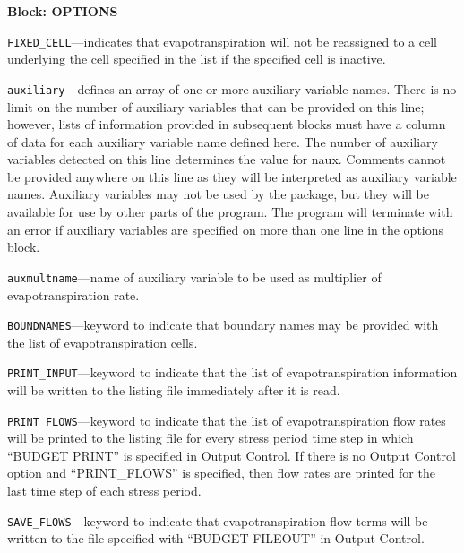 
\item \textbf{Block: OPTIONS}

\begin{description}
\item \texttt{FIXED\_CELL}---indicates that evapotranspiration will not be reassigned to a cell underlying the cell specified in the list if the specified cell is inactive.

\item \texttt{auxiliary}---defines an array of one or more auxiliary variable names.  There is no limit on the number of auxiliary variables that can be provided on this line; however, lists of information provided in subsequent blocks must have a column of data for each auxiliary variable name defined here.   The number of auxiliary variables detected on this line determines the value for naux.  Comments cannot be provided anywhere on this line as they will be interpreted as auxiliary variable names.  Auxiliary variables may not be used by the package, but they will be available for use by other parts of the program.  The program will terminate with an error if auxiliary variables are specified on more than one line in the options block.

\item \texttt{auxmultname}---name of auxiliary variable to be used as multiplier of evapotranspiration rate.

\item \texttt{BOUNDNAMES}---keyword to indicate that boundary names may be provided with the list of evapotranspiration cells.

\item \texttt{PRINT\_INPUT}---keyword to indicate that the list of evapotranspiration information will be written to the listing file immediately after it is read.

\item \texttt{PRINT\_FLOWS}---keyword to indicate that the list of evapotranspiration flow rates will be printed to the listing file for every stress period time step in which ``BUDGET PRINT'' is specified in Output Control.  If there is no Output Control option and ``PRINT\_FLOWS'' is specified, then flow rates are printed for the last time step of each stress period.

\item \texttt{SAVE\_FLOWS}---keyword to indicate that evapotranspiration flow terms will be written to the file specified with ``BUDGET FILEOUT'' in Output Control.


\end{description}
